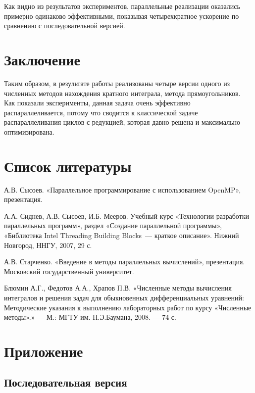 \documentclass{article}
\begin{document}
\par Как видно из результатов экспериментов, параллельные реализации оказались примерно одинаково эффективными, показывая четырехкратное ускорение по сравнению с последовательной версией.

\newpage

\section{Заключение}

\par Таким образом, в результате работы реализованы четыре версии одного из численных методов нахождения кратного интеграла, метода прямоугольников. Как показали эксперименты, данная задача очень эффективно распараллеливается, потому что сводится к классической задаче распараллеливания циклов с редукцией, которая давно решена и максимально оптимизирована.
\newpage

\section{Список литературы}
\begin{enumerate}
 А.В. Сысоев. «Параллельное программирование с использованием OpenMP», презентация.

 А.А. Сиднев, А.В. Сысоев, И.Б. Мееров. Учебный курс «Технологии разработки параллельных программ», раздел «Создание параллельной программы», «Библиотека Intel Threading Building Blocks~--- краткое описание». Нижний Новгород, ННГУ, 2007, 29 с. 

 А.В. Старченко. «Введение в методы параллельных вычислений», презентация. Московский государственный университет.

 Блюмин А.Г., Федотов А.А., Храпов П.В. «Численные методы вычисления интегралов и решения задач для обыкновенных дифференциальных уравнений: Методические указания к выполнению лабораторных работ по курсу «Численные методы».» — М.: МГТУ им. Н.Э.Баумана, 2008. — 74 с.
\end{enumerate}

\newpage

\section{Приложение}
\subsection{Последовательная версия}



\end{document}
